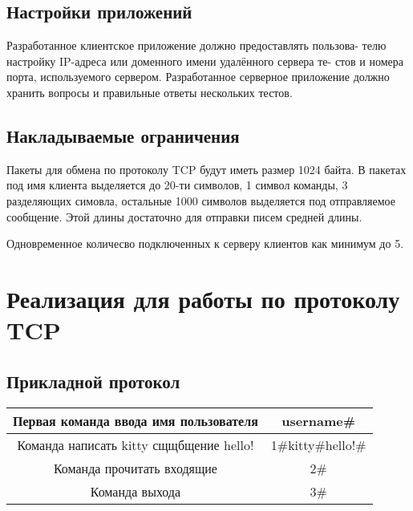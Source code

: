 \documentclass[12pt,a4paper]{report}
\begin{document}
\section{Настройки приложений}
Разработанное клиентское приложение должно предоставлять пользова-
телю настройку IP-адреса или доменного имени удалённого сервера те-
стов и номера порта, используемого сервером. Разработанное серверное
приложение должно хранить вопросы и правильные ответы нескольких
тестов.
\section{Накладываемые ограничения}

Пакеты для обмена по протоколу TCP будут иметь размер 1024 байта. В пакетах под имя клиента выделяется до 20-ти символов, 1 символ команды, 3 разделяющих симовла, остальные 1000 символов выделяется под отправляемое сообщение. Этой длины достаточно для отправки писем средней длины.%


Одновременное количесво подключенных к серверу клиентов как минимум до 5.

\chapter{Реализация для работы по протоколу TCP}
\section{Прикладной протокол}
\label{protocol_tcp}
\begin{tabular}{|c|c|}
\hline 
Первая команда ввода имя пользователя & username\# \\ 
\hline 
Команда написать kitty сщщбщение hello! & 1\#kitty\#hello!\# \\ 
\hline 
Команда прочитать входящие & 2\# \\
\hline 
Команда выхода & 3\# \\
\hline 
\end{tabular} 
\end{document}
